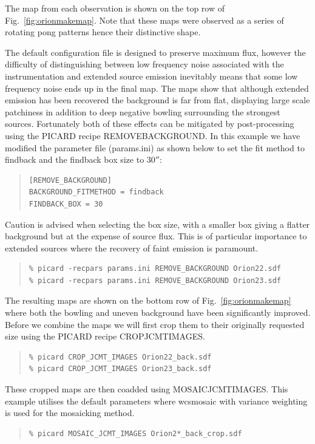 \documentclass[twoside,11pt]{article}
\renewcommand{\_}{\texttt{\symbol{95}}}
\newenvironment{myquote}{\begin{quote}\begin{small}}{\end{small}\end{quote}}
\begin{document}
The map from each observation is shown on the top row of
Fig.~\ref{fig:orionmakemap}. Note that these maps were observed as a
series of rotating pong patterns hence their distinctive shape.

The default configuration file is designed to preserve maximum flux,
however the difficulty of distinguishing between low frequency noise
associated with the instrumentation and extended source emission
inevitably means that some low frequency noise ends up in the final
map. The maps show that although extended emission has been recovered
the background is far from flat, displaying large scale patchiness in
addition to deep negative bowling surrounding the strongest
sources. Fortunately both of these effects can be mitigated by
post-processing using the PICARD recipe REMOVE\_BACKGROUND. In this
example we have modified the parameter file (params.ini) as shown
below to set the fit method to findback and the findback box size to
30$''$:
\begin{myquote}
\begin{verbatim}
[REMOVE_BACKGROUND]
BACKGROUND_FITMETHOD = findback
FINDBACK_BOX = 30
\end{verbatim}
\end{myquote}
Caution is advised when selecting the box size, with a smaller box
giving a flatter background but at the expense of source flux. This is
of particular importance to extended sources where the recovery of
faint emission is paramount.

\begin{myquote}
\begin{verbatim}
% picard -recpars params.ini REMOVE_BACKGROUND Orion22.sdf
% picard -recpars params.ini REMOVE_BACKGROUND Orion23.sdf
\end{verbatim}
\end{myquote}
The resulting maps are shown on the bottom row of
Fig.~\ref{fig:orionmakemap} where both the bowling and uneven
background have been significantly improved. Before we combine the
maps we will first crop them to their originally requested size using
the PICARD recipe CROP\_JCMT\_IMAGES.
\begin{myquote}
\begin{verbatim}
% picard CROP_JCMT_IMAGES Orion22_back.sdf
% picard CROP_JCMT_IMAGES Orion23_back.sdf
\end{verbatim}
\end{myquote}

These cropped maps are then coadded using MOSAIC\_JCMT\_IMAGES. This
example utilises the default parameters where wcsmosaic with variance
weighting is used for the mosaicking method.
\begin{myquote}
\begin{verbatim}
% picard MOSAIC_JCMT_IMAGES Orion2*_back_crop.sdf
\end{verbatim}
\end{myquote}
\end{document}
